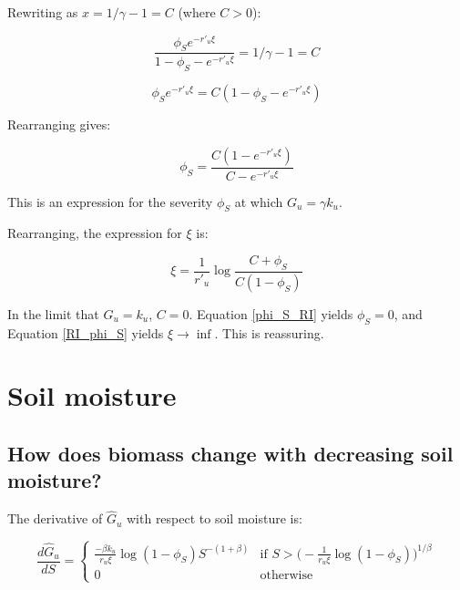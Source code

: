 \documentclass{article}
\begin{document}
Rewriting as  $x = 1/\gamma  - 1= C$ (where $C> 0$):

\begin{equation}
 \frac{ \phi_S  e^{-r'_u \xi}}{1- \phi_S - e^{-r'_u \xi}} =  1/\gamma  - 1 = C
\end{equation}

\begin{equation}
{ \phi_S  e^{-r'_u \xi}} = C ({1- \phi_S - e^{-r'_u \xi}} )
\end{equation}

Rearranging gives:

\begin{equation}
 \phi_S   =  \frac{C(1 - e^{-r'_u \xi})}{C  - e^{-r'_u \xi}}
 \label{phi_S_RI}
 \end{equation}

This is an expression for the severity $ \phi_S $ at which $G_u = \gamma k_u$.

Rearranging, the expression for $\xi$ is:


\begin{equation}
\xi   =  \frac{1}{r'_u}\log \frac{C  +\phi_S } {C(1 - \phi_S)}
 \label{RI_phi_S}
 \end{equation}

In the limit that  $G_u = k_u$, $C=0$.
 Equation \ref{phi_S_RI} yields $\phi_S = 0$,  and Equation \ref{RI_phi_S} yields $\xi \rightarrow \inf$.
 This is reassuring.




\section{Soil moisture}

\subsection{How does biomass change with decreasing soil moisture?}

    The derivative of $\hat G_u$ with respect to soil moisture is:
    
    \begin{equation}
    \frac{ d\hat{G}_u }{dS} =
        \begin{cases}
          \frac{-\beta k_u }{r_u \xi} \log(1-\phi_S) S^{-(1+\beta)}
    		& \text{if  } S > \big( - \frac{1}{r_u \xi }\log (1 - \phi_S)\big)^{1/\beta}
    		\\[10pt]
          0 & \text{otherwise}
        \end{cases}
    \end{equation}
    
\end{document}
